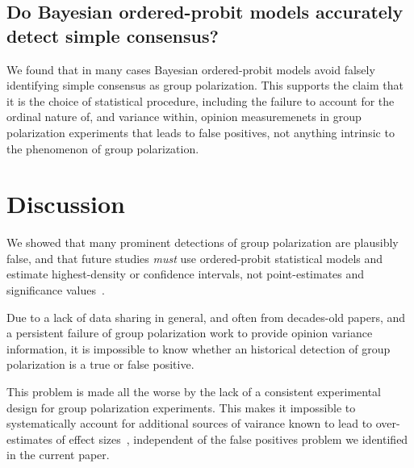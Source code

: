 \documentclass[11pt, letterpaper]{article}
\begin{document}
\hspace{-1em}

% 

\subsection{Do Bayesian ordered-probit models accurately detect simple consensus?}

We found that in many cases Bayesian ordered-probit models avoid falsely identifying simple
consensus as group polarization. This supports the claim that it is the choice of statistical
procedure, including the failure to account for the ordinal nature of, and variance within,
opinion measuremenets in group polarization experiments that leads to false
positives, not anything intrinsic to the phenomenon of group polarization.


\section{Discussion}

We showed that many prominent detections of group polarization are plausibly
false, and that future studies \emph{must} use ordered-probit statistical
models and estimate highest-density or confidence intervals, not point-estimates 
and significance values~\cite{Meehl1997}.

Due to a lack of data sharing in general, and often from decades-old papers, and a persistent 
failure of group polarization work to provide opinion variance information, 
it is impossible to know whether an historical detection of group polarization
is a true or false positive. 

This problem is made all the worse by the lack of a consistent experimental design for group
polarization experiments. This makes it impossible to systematically account for
additional sources of vairance known to lead to over-estimates
of effect sizes~\cite{Yarkoni2021}, independent of the false positives problem
we identified in the current paper. 

\end{document}
